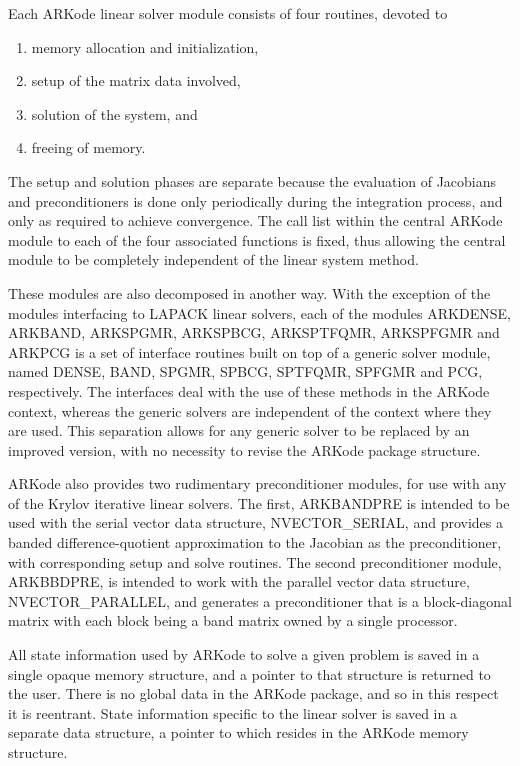 \documentclass[letterpaper,10pt,english]{sphinxmanual}
\begin{document}
Each ARKode linear solver module consists of four routines,
devoted to
\begin{enumerate}
\item {} 
memory allocation and initialization,

\item {} 
setup of the matrix data involved,

\item {} 
solution of the system, and

\item {} 
freeing of memory.

\end{enumerate}

The setup and solution phases are separate because the evaluation of
Jacobians and preconditioners is done only periodically during the
integration process, and only as required to achieve convergence.  The
call list within the central ARKode module to each of the four
associated functions is fixed, thus allowing the central module to be
completely independent of the linear system method.

These modules are also decomposed in another way.  With the exception
of the modules interfacing to LAPACK linear solvers,
each of the modules ARKDENSE, ARKBAND, ARKSPGMR, ARKSPBCG, ARKSPTFQMR,
ARKSPFGMR and ARKPCG is a set of interface routines built
on top of a generic solver module, named DENSE, BAND,
SPGMR, SPBCG, SPTFQMR, SPFGMR and PCG, respectively.  The interfaces
deal with the use of these methods in the ARKode context, whereas
the generic solvers are independent of the context where they are
used.  This separation allows for any generic solver to be replaced by
an improved version, with no necessity to revise the ARKode
package structure.

ARKode also provides two rudimentary preconditioner modules, for
use with any of the Krylov iterative linear solvers.  The first,
ARKBANDPRE is intended to be used with the serial vector data
structure, NVECTOR\_SERIAL, and provides a banded
difference-quotient approximation to the Jacobian as the
preconditioner, with corresponding setup and solve routines.  The
second preconditioner module, ARKBBDPRE, is intended to work with the
parallel vector data structure, NVECTOR\_PARALLEL, and generates a
preconditioner that is a block-diagonal matrix with each block being a
band matrix owned by a single processor.

All state information used by ARKode to solve a given problem is
saved in a single opaque memory structure, and a pointer to that
structure is returned to the user.  There is no global data in the
ARKode package, and so in this respect it is reentrant.  State
information specific to the linear solver is saved in a separate data
structure, a pointer to which resides in the ARKode memory
structure.
\end{document}
